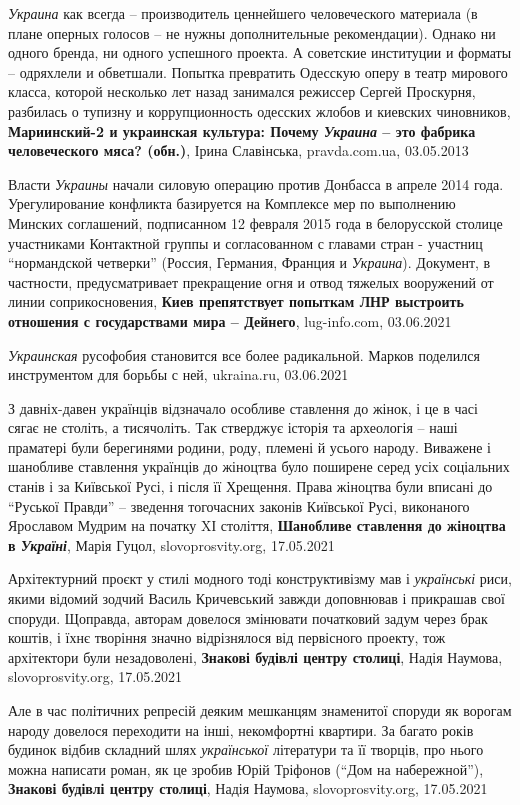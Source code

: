 \emph{Украина} как всегда – производитель ценнейшего человеческого материала (в плане
оперных голосов – не нужны дополнительные рекомендации). Однако ни одного
бренда, ни одного успешного проекта. А советские институции и форматы –
одряхлели и обветшали.  Попытка превратить Одесскую оперу в театр мирового
класса, которой несколько лет назад занимался режиссер Сергей Проскурня,
разбилась о тупизну и коррупционность одесских жлобов и киевских чиновников,
\textbf{Мариинский-2 и украинская культура: Почему \emph{Украина} – это фабрика человеческого мяса? (обн.)},
Ірина Славінська, pravda.com.ua, 03.05.2013

Власти \emph{Украины} начали силовую операцию против Донбасса в апреле 2014 года.
Урегулирование конфликта базируется на Комплексе мер по выполнению Минских
соглашений, подписанном 12 февраля 2015 года в белорусской столице участниками
Контактной группы и согласованном с главами стран - участниц \enquote{нормандской
четверки} (Россия, Германия, Франция и \emph{Украина}). Документ, в частности,
предусматривает прекращение огня и отвод тяжелых вооружений от линии
соприкосновения,
\textbf{Киев препятствует попыткам ЛНР выстроить отношения 
с государствами мира – Дейнего}, lug-info.com, 03.06.2021

\emph{Украинская} русофобия становится все более радикальной. Марков поделился инструментом для борьбы с ней,
ukraina.ru, 03.06.2021

З давніх-давен українців відзначало особливе ставлення до жінок, і це в часі
сягає не століть, а тисячоліть. Так стверджує історія та археологія – наші
праматері були берегинями родини, роду, племені й усього народу.  Виважене і
шанобливе ставлення українців до жіноцтва було поширене серед усіх соціальних
станів і за Київської Русі, і після її Хрещення. Права жіноцтва були вписані
до \enquote{Руської Правди} – зведення тогочасних законів Київської Русі, виконаного
Ярославом Мудрим на початку XІ століття,
\textbf{Шанобливе ставлення до жіноцтва в \emph{Україні}},
Марія Гуцол, slovoprosvity.org, 17.05.2021

Архітектурний проєкт у стилі модного тоді конструктивізму мав і \emph{українські}
риси, якими відомий зодчий Василь Кричевський завжди доповнював і прикрашав
свої споруди. Щоправда, авторам довелося змінювати початковий задум через брак
коштів, і їхнє творіння значно відрізнялося від первісного проекту, тож
архітектори були незадоволені,
\textbf{Знакові будівлі центру столиці}, Надія Наумова, slovoprosvity.org, 17.05.2021

Але в час політичних репресій деяким мешканцям знаменитої споруди як ворогам
народу довелося переходити на інші, некомфортні квартири. За багато років
будинок відбив складний шлях \emph{української} літератури та її творців, про нього
можна написати роман, як це зробив Юрій Тріфонов (\enquote{Дом на набережной}),
\textbf{Знакові будівлі центру столиці}, Надія Наумова, slovoprosvity.org, 17.05.2021

